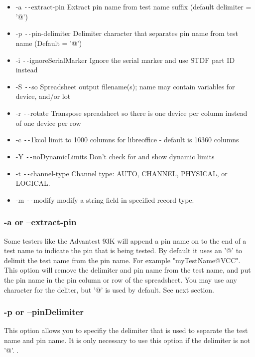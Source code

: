 \documentclass[letterpaper]{article}
\begin{document}
\begin{itemize}
\item -a        \texttt{-{}-}extract-pin Extract pin name from test name suffix (default delimiter = '@')
\item -p      \texttt{-{}-}pin-delimiter Delimiter character that separates pin name from test name (Default = '@')
\item -i \texttt{-{}-}ignoreSerialMarker Ignore the serial marker and use STDF part ID instead
\item -S                 \texttt{-{}-}so Spreadsheet output filename(s); name may contain variables for device, and/or lot
\item -r             \texttt{-{}-}rotate Transpose spreadsheet so there is one device per column instead of one device per row
\item -c              \texttt{-{}-}1kcol limit to 1000 columns for libreoffice - default is 16360 columns
\item -Y    \texttt{-{}-}noDynamicLimits Don't check for and show dynamic limits
\item -t       \texttt{-{}-}channel-type Channel type: AUTO, CHANNEL, PHYSICAL, or LOGICAL.
\item -m             \texttt{-{}-}modify modify a string field in specified record type.
\end{itemize}

\subsubsection{-a or --extract-pin}
Some testers like the Advantest 93K will append a pin name on to the end of a test name
to indicate the pin that is being tested.  By default it uses an \makeatletter '@' \makeatother
to delimit the test name from the pin name.  For example \makeatletter "myTestName@VCC". \makeatother
This option will remove the delimiter and pin name from the test name, and put the pin name
in the pin column or row of the spreadsheet.  You may use any character for the deliter,
but \makeatletter '@' \makeatother is used by default.  See next section.

\subsubsection{-p or --pinDelimiter}
This option allows you to specifiy the delimiter that is used to separate the test name and pin name.
It is only necessary to use this option if the delimiter is not \makeatletter '@'. \makeatother.
\end{document}
